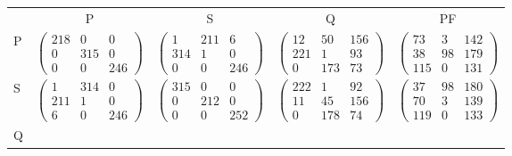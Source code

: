 \begin{tabular}{p{0.5cm}cccc}
 & P & S & Q & PF\\ 
P & 
 $\begin{pmatrix}
     218  &       0  &       0 \\
       0  &     315  &       0 \\
       0  &       0  &     246 
\end{pmatrix}$
 & 
 $\begin{pmatrix}
       1  &     211  &       6 \\
     314  &       1  &       0 \\
       0  &       0  &     246 
\end{pmatrix}$
 & 
 $\begin{pmatrix}
      12  &      50  &     156 \\
     221  &       1  &      93 \\
       0  &     173  &      73 
\end{pmatrix}$
 & 
 $\begin{pmatrix}
      73  &       3  &     142 \\
      38  &      98  &     179 \\
     115  &       0  &     131 
\end{pmatrix}$
\\ 
S & 
 $\begin{pmatrix}
       1  &     314  &       0 \\
     211  &       1  &       0 \\
       6  &       0  &     246 
\end{pmatrix}$
 & 
 $\begin{pmatrix}
     315  &       0  &       0 \\
       0  &     212  &       0 \\
       0  &       0  &     252 
\end{pmatrix}$
 & 
 $\begin{pmatrix}
     222  &       1  &      92 \\
      11  &      45  &     156 \\
       0  &     178  &      74 
\end{pmatrix}$
 & 
 $\begin{pmatrix}
      37  &      98  &     180 \\
      70  &       3  &     139 \\
     119  &       0  &     133 
\end{pmatrix}$
\\ 
Q & 

\end{tabular}
